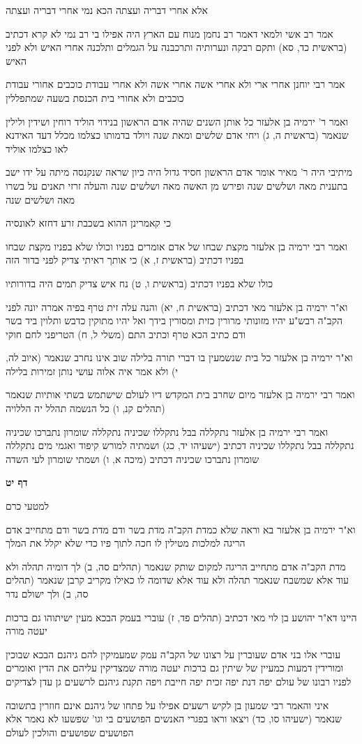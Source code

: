 \documentclass[12pt, openany]{book}
\newcommand{\sethebfont}{
\fontsize{10.5pt}{21.0pt} \selectfont
}
\newcommand{\textblock}[1]{
{\sethebfont #1\\}	
}
\newcommand{\sectname}{}
\newcommand{\newsection}[1]{
	\addcontentsline{toc}{section}{#1}
	\renewcommand{\sectname}{#1}	
	\vspace{-\baselineskip}
	\begin{center}
		\textbf{%
\fontsize{16pt}{16pt}\selectfont
			#1}
	\end{center}
	\vspace{-\baselineskip}
	\nopagebreak
}
\begin{document}
\textblock{אלא אחרי דבריה ועצתה הכא נמי אחרי דבריה ועצתה}
\textblock{אמר רב אשי ולמאי דאמר רב נחמן מנוח עם הארץ היה אפילו בי רב נמי לא קרא דכתיב (בראשית כד, סא) ותקם רבקה ונערותיה ותרכבנה על הגמלים ותלכנה אחרי האיש ולא לפני האיש}
\textblock{אמר רבי יוחנן אחרי ארי ולא אחרי אשה אחרי אשה ולא אחרי עבודת כוכבים אחורי עבודת כוכבים ולא אחורי בית הכנסת בשעה שמתפללין}
\textblock{ואמר ר' ירמיה בן אלעזר כל אותן השנים שהיה אדם הראשון בנידוי הוליד רוחין ושידין ולילין שנאמר (בראשית ה, ג) ויחי אדם שלשים ומאת שנה ויולד בדמותו כצלמו מכלל דעד האידנא לאו כצלמו אוליד}
\textblock{מיתיבי היה ר' מאיר אומר אדם הראשון חסיד גדול היה כיון שראה שנקנסה מיתה על ידו ישב בתענית מאה ושלשים שנה ופירש מן האשה מאה ושלשים שנה והעלה זרזי תאנים על בשרו מאה ושלשים שנה}
\textblock{כי קאמרינן ההוא בשכבת זרע דחזא לאונסיה}
\textblock{ואמר רבי ירמיה בן אלעזר מקצת שבחו של אדם אומרים בפניו וכולו שלא בפניו מקצת שבחו בפניו דכתיב (בראשית ז, א) כי אותך ראיתי צדיק לפני בדור הזה}
\textblock{כולו שלא בפניו דכתיב (בראשית ו, ט) נח איש צדיק תמים היה בדורותיו}
\textblock{וא"ר ירמיה בן אלעזר מאי דכתיב (בראשית ח, יא) והנה עלה זית טרף בפיה אמרה יונה לפני הקב"ה רבש"ע יהיו מזונותי מרורין כזית ומסורין בידך ואל יהיו מתוקין כדבש ותלוין ביד בשר ודם כתיב הכא טרף וכתיב התם (משלי ל, ח) הטריפני לחם חוקי}
\textblock{וא"ר ירמיה בן אלעזר כל בית שנשמעין בו דברי תורה בלילה שוב אינו נחרב שנאמר (איוב לה, י) ולא אמר איה אלוה עושי נותן זמירות בלילה}
\textblock{ואמר רבי ירמיה בן אלעזר מיום שחרב בית המקדש דיו לעולם שישתמש בשתי אותיות שנאמר (תהלים קנ, ו) כל הנשמה תהלל יה הללויה}
\textblock{ואמר רבי ירמיה בן אלעזר נתקללה בבל נתקללו שכיניה נתקללה שומרון נתברכו שכיניה נתקללה בבל נתקללו שכיניה דכתיב (ישעיהו יד, כג) ושמתיה למורש קיפוד ואגמי מים נתקללה שומרון נתברכו שכיניה דכתיב (מיכה א, ו) ושמתי שומרון לעי השדה}
\newsection{דף יט}
\textblock{למטעי כרם}
\textblock{וא"ר ירמיה בן אלעזר בא וראה שלא כמדת הקב"ה מדת בשר ודם מדת בשר ודם מתחייב אדם הריגה למלכות מטילין לו חכה לתוך פיו כדי שלא יקלל את המלך}
\textblock{מדת הקב"ה אדם מתחייב הריגה למקום שותק שנאמר (תהלים סה, ב) לך דומיה תהלה ולא עוד אלא שמשבח שנאמר תהלה ולא עוד אלא שדומה לו כאילו מקריב קרבן שנאמר (תהלים סה, ב) ולך ישולם נדר}
\textblock{היינו דא"ר יהושע בן לוי מאי דכתיב (תהלים פד, ז) עוברי בעמק הבכא מעין ישיתוהו גם ברכות יעטה מורה}
\textblock{עוברי אלו בני אדם שעוברין על רצונו של הקב"ה עמק שמעמיקין להם גיהנם הבכא שבוכין ומורידין דמעות כמעיין של שיתין גם ברכות יעטה מורה שמצדיקין עליהם את הדין ואומרים לפניו רבונו של עולם יפה דנת יפה זכית יפה חייבת ויפה תקנת גיהנם לרשעים גן עדן לצדיקים}
\textblock{איני והאמר רבי שמעון בן לקיש רשעים אפילו על פתחו של גיהנם אינם חוזרין בתשובה שנאמר (ישעיהו סו, כד) ויצאו וראו בפגרי האנשים הפושעים בי וגו' שפשעו לא נאמר אלא הפושעים שפושעים והולכין לעולם}
\end{document}
